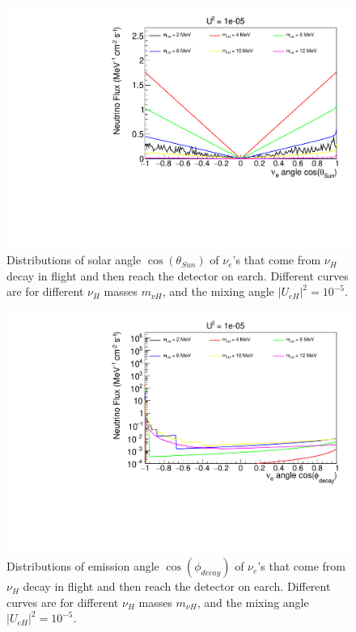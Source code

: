 \documentclass[%
 reprint,
 amsmath,amssymb,
 aps,
 prd,
twocolumn,
]{revtex4-1}
\begin{document}
\begin{figure}[!ht]
\includegraphics[width=0.99\columnwidth]{../plots/DecayInFlightNuLCosthetaSun_U1e-05_AllMass_linXlinY.pdf}
\caption{Distributions of solar angle $\cos(\theta_{Sun})$ of $\nu_e$'s that come from $\nu_H$ decay in flight and then reach the detector on earch. Different curves are for different $\nu_H$ masses $m_{\nu H}$, and the mixing angle $|U_{eH}|^2 = 10^{-5}$.}
\label{fig:DecayInFlightTheta_U1em5_AllMass}
\end{figure}

\begin{figure}[!ht]
\includegraphics[width=0.99\columnwidth]{../plots/DecayInFlightNuLCosphiSun_U1e-05_AllMass_linXlogY.pdf}
\caption{Distributions of emission angle $\cos(\phi_{decay})$ of $\nu_e$'s that come from $\nu_H$ decay in flight and then reach the detector on earch. Different curves are for different $\nu_H$ masses $m_{\nu H}$, and the mixing angle $|U_{eH}|^2 = 10^{-5}$.}
\label{fig:DecayInFlightPhi_U1em5_AllMass}
\end{figure}
\end{document}
